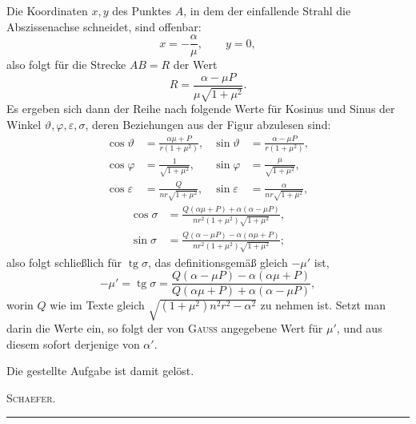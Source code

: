 Die Koordinaten $x,y$ des Punktes $A$, in dem der einfallende Strahl die Abszissenachse schneidet, sind offenbar:
\[
x=-\frac\alpha\mu,\qquad y=0,
\]
\noindent also folgt für die Strecke $AB=R$ der Wert
\[
R=\frac{\alpha-\mu P}{\mu\sqrt{1+\mu^2}}.
\]
\clearpage{}
\noindent Es ergeben sich dann der Reihe nach folgende Werte für Kosinus und Sinus der Winkel $\vartheta,\varphi,\varepsilon,\sigma$, deren Beziehungen aus der Figur abzulesen sind:
\[
\begin{aligned}
\cos\vartheta&=\frac{\alpha\mu+P}{r(1+\mu^2)},&\sin\vartheta&=\frac{\alpha-\mu P}{r(1+\mu^2)},\\[6pt]
\cos\varphi&=\frac1{\sqrt{1+\mu^2}},&\sin\varphi&=\frac\mu{\sqrt{1+\mu^2}},\\[6pt]
\cos\varepsilon&=\frac Q{nr\sqrt{1+\mu^2}},&\sin\varepsilon&=\frac\alpha{nr\sqrt{1+\mu^2}},
\end{aligned}
\]
\[
\begin{aligned}
\cos\sigma&=\frac{Q(\alpha\mu+P)+\alpha(\alpha-\mu P)}{nr^2(1+\mu^2)\sqrt{1+\mu^2}},\\[6pt]
\sin\sigma&=\frac{Q(\alpha-\mu P)-\alpha(\alpha\mu+P)}{nr^2(1+\mu^2)\sqrt{1+\mu^2}};
\end{aligned}
\]
\noindent also folgt schließlich für $\operatorname{tg}\sigma$, das definitionsgemäß gleich $-\mu'$ ist,
\[
-\mu'=\operatorname{tg}\sigma=\frac{Q(\alpha-\mu P)-\alpha(\alpha\mu+P)}{Q(\alpha\mu+P)+\alpha(\alpha-\mu P)},
\]
\noindent worin $Q$ wie im Texte gleich $\sqrt{(1+\mu^2)n^2r^2-\alpha^2}$ zu nehmen ist. Setzt man darin die Werte ein, so folgt der von \textsc{Gauss} angegebene Wert für $\mu'$, und aus diesem sofort derjenige von $\alpha'$.

Die gestellte Aufgabe ist damit gelöst.
\begin{flushright}\textsc{Schaefer.}\end{flushright}
\begin{center}\rule{.25\linewidth}{.4pt}\end{center}
\clearpage\endgroup
